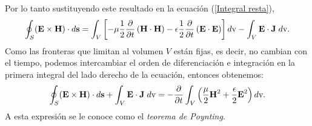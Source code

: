 \documentclass[11pt,fleqn]{book} %
\begin{document}
Por lo tanto sustituyendo este resultado en la ecuaci\'on (\ref{Integral resta}),
\begin{equation}
\oint_{S}(\textbf{E}\times\textbf{H})\cdot d\textbf{s}=\int_{V}\left[-\mu\frac{1}{2}\frac{\partial}{\partial t}\left(\textbf{H}\cdot\textbf{H}\right)-\epsilon\frac{1}{2}\frac{\partial}{\partial t}\left(\textbf{E}\cdot\textbf{E}\right)\right]d\text{v}-\int_{V} \textbf{E}\cdot\textbf{J} \hspace{1mm} d\text{v}.
\end{equation}
Como las fronteras que limitan al volumen $V$ est\'an fijas, es decir, no cambian con el tiempo, podemos intercambiar el orden de diferenciaci\'on e integraci\'on en la primera integral del lado derecho de la ecuaci\'on, entonces obtenemos:
\begin{equation}
\oint_{S}(\textbf{E}\times\textbf{H})\cdot d\textbf{s}+\int_{V} \textbf{E}\cdot\textbf{J} \hspace{1mm} d\text{v}=-\frac{\partial}{\partial t}\int_{V}\left(\frac{\mu}{2}\textbf{H}^{2}+\frac{\epsilon}{2}\textbf{E}^{2}\right)d\text{v}. \label{Teorema de Poynting}
\end{equation}
A esta expresi\'on se le conoce como el \textit{teorema de Poynting}.\cite{Griffiths1999}\\
\end{document}
